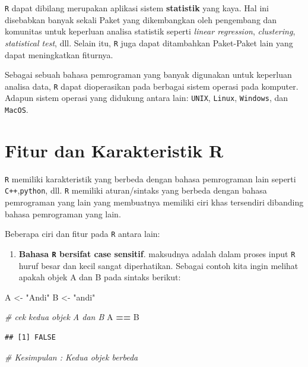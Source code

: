 \documentclass[
]{book}
\newenvironment{Shaded}{\begin{snugshade}}{\end{snugshade}}
\newcommand{\CommentTok}[1]{\textcolor[rgb]{0.56,0.35,0.01}{\textit{#1}}}
\newcommand{\NormalTok}[1]{#1}
\newcommand{\OtherTok}[1]{\textcolor[rgb]{0.56,0.35,0.01}{#1}}
\newcommand{\SpecialCharTok}[1]{\textcolor[rgb]{0.81,0.36,0.00}{\textbf{#1}}}
\newcommand{\StringTok}[1]{\textcolor[rgb]{0.31,0.60,0.02}{#1}}
\providecommand{\tightlist}{%
  \setlength{\itemsep}{0pt}\setlength{\parskip}{0pt}}
\theoremstyle{definition}
\theoremstyle{definition}
\theoremstyle{definition}
\theoremstyle{definition}
\theoremstyle{remark}
\begin{document}
\texttt{R} dapat dibilang merupakan aplikasi sistem \textbf{statistik} yang kaya. Hal ini disebabkan banyak sekali Paket yang dikembangkan oleh pengembang dan komunitas untuk keperluan analisa statistik seperti \emph{linear regression}, \emph{clustering}, \emph{statistical test}, dll. Selain itu, \texttt{R} juga dapat ditambahkan Paket-Paket lain yang dapat meningkatkan fiturnya.

Sebagai sebuah bahasa pemrograman yang banyak digunakan untuk keperluan analisa data, \texttt{R} dapat dioperasikan pada berbagai sistem operasi pada komputer. Adapun sistem operasi yang didukung antara lain: \texttt{UNIX}, \texttt{Linux}, \texttt{Windows}, dan \texttt{MacOS}.

\hypertarget{fiturR}{%
\section{Fitur dan Karakteristik R}\label{fiturR}}

\texttt{R} memiliki karakteristik yang berbeda dengan bahasa pemrograman lain seperti \texttt{C++},\texttt{python}, dll. \texttt{R} memiliki aturan/sintaks yang berbeda dengan bahasa pemrograman yang lain yang membuatnya memiliki ciri khas tersendiri dibanding bahasa pemrograman yang lain.

Beberapa ciri dan fitur pada \texttt{R} antara lain:

\begin{enumerate}
\def\labelenumi{\arabic{enumi}.}
\tightlist
\item
  \textbf{Bahasa \texttt{R} bersifat case sensitif}. maksudnya adalah dalam proses input \texttt{R} huruf besar dan kecil sangat diperhatikan. Sebagai contoh kita ingin melihat apakah objek A dan B pada sintaks berikut:
\end{enumerate}

\begin{Shaded}
\begin{Highlighting}[]
\NormalTok{A }\OtherTok{\textless{}{-}} \StringTok{"Andi"}
\NormalTok{B }\OtherTok{\textless{}{-}} \StringTok{"andi"}

\CommentTok{\# cek kedua objek A dan B}
\NormalTok{A }\SpecialCharTok{==}\NormalTok{ B}
\end{Highlighting}
\end{Shaded}

\begin{verbatim}
## [1] FALSE
\end{verbatim}

\begin{Shaded}
\begin{Highlighting}[]
\CommentTok{\# Kesimpulan : Kedua objek berbeda}
\end{Highlighting}
\end{Shaded}
\end{document}
